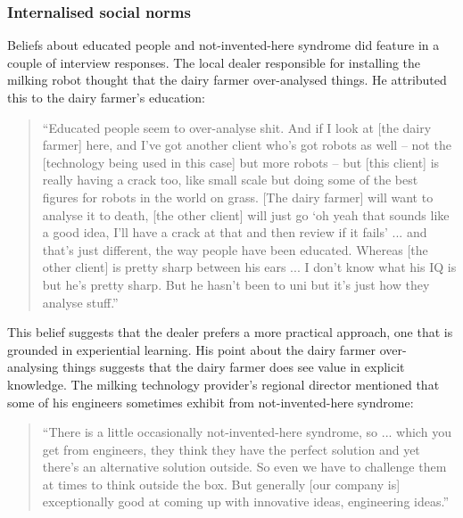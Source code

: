 \subsubsection{Internalised social norms}

Beliefs about educated people and not-invented-here syndrome did feature in a couple of interview responses. The local dealer responsible for installing the milking robot thought that the dairy farmer over-analysed things. He attributed this to the dairy farmer's education:

\begin{quote}
\small
\enquote{Educated people seem to over-analyse shit. And if I look at [the dairy farmer] here, and I've got another client who's got robots as well – not the [technology being used in this case] but more robots – but [this client] is really having a crack too, like small scale but doing some of the best figures for robots in the world on grass. [The dairy farmer] will want to analyse it to death, [the other client] will just go \enquote{oh yeah that sounds like a good idea, I'll have a crack at that and then review if it fails} ... and that's just different, the way people have been educated.  Whereas [the other client] is pretty sharp between his ears ... I don’t know what his IQ is but he's pretty sharp. But he hasn't been to uni but it's just how they analyse stuff.} \\
\end{quote}

This belief suggests that the dealer prefers a more practical approach, one that is grounded in experiential learning. His point about the dairy farmer over-analysing things suggests that the dairy farmer does see value in explicit knowledge. The milking technology provider's regional director mentioned that some of his engineers sometimes exhibit from not-invented-here syndrome:

\begin{quote}
\small
\enquote{There is a little occasionally not-invented-here syndrome, so ... which you get from engineers, they think they have the perfect solution and yet there's an alternative solution outside. So even we have to challenge them at times to think outside the box. But generally [our company is] exceptionally good at coming up with innovative ideas, engineering ideas.} \\
\end{quote}

